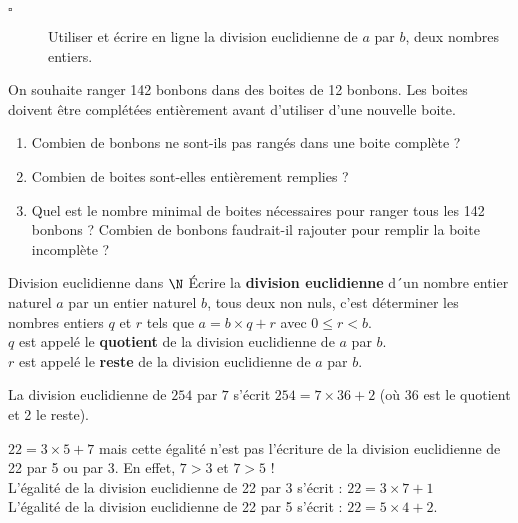 \begin{titre}[Arithmétique]

\end{titre}

 

\begin{CpsCol}
\begin{description}
\item[$\square$] Utiliser et écrire en ligne la division euclidienne de $a$ par $b$, deux nombres entiers.
\end{description}
\end{CpsCol}



On souhaite ranger 142 bonbons dans des boites de 12 bonbons. Les boites doivent être complétées entièrement avant d'utiliser d'une nouvelle boite. 
\begin{enumerate}
\item Combien de bonbons ne sont-ils pas rangés dans une boite complète ?
\item Combien de boites sont-elles entièrement remplies ?
\item Quel est le nombre minimal de boites nécessaires pour ranger tous les 142 bonbons ? Combien de bonbons faudrait-il rajouter pour remplir la boite incomplète ? 
\end{enumerate}






\begin{DefT}{Division euclidienne dans $\N$}
Écrire la \textbf{division euclidienne} d´un nombre entier naturel $a$ par un entier naturel $b$, tous deux non nuls, c'est déterminer les nombres entiers $q$ et $r$ tels que $a=b \times q + r$ avec $0 \leq r < b$.\\
$q$ est appelé le \textbf{quotient} de la division euclidienne de $a$ par $b$.\\
$r$ est appelé le \textbf{reste}  de la division euclidienne de $a$ par $b$. 
\end{DefT}

\begin{Ex}
La division euclidienne de $254$ par $7$ s'écrit $254=7 \times 36 + 2$ (où 36 est le quotient et 2 le reste). 
\end{Ex}

\begin{Att}
$22 = 3 \times 5 + 7$ mais cette égalité n'est pas l'écriture de la division euclidienne de 22 par 5 ou par 3. En effet, $7>3$ et $7>5$ ! \\
L'égalité de la division euclidienne de 22 par 3 s'écrit : $22=3 \times 7 + 1$\\
L'égalité de la division euclidienne de 22 par 5 s'écrit : $22=5 \times 4 + 2$.
\end{Att}


